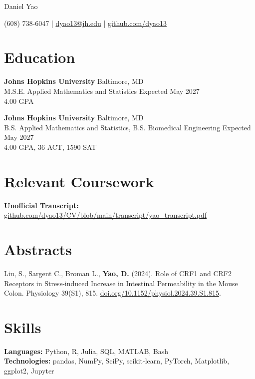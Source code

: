 \documentclass[11pt]{article}       %
\begin{document}
\centerline{\Huge Daniel Yao}

\vspace{5pt}

\centerline{(608) 738-6047 | \href{mailto:dyao13@jh.edu}{dyao13@jh.edu} | \href{https://github.com/dyao13/}{github.com/dyao13}}

\vspace{-9pt}

\section*{Education}
\textbf{Johns Hopkins University} \hfill Baltimore, MD \\
M.S.E. Applied Mathematics and Statistics \hfill Expected May 2027 \\
4.00 GPA

\vspace{5pt}

\textbf{Johns Hopkins University} \hfill Baltimore, MD \\
B.S. Applied Mathematics and Statistics, B.S. Biomedical Engineering \hfill Expected May 2027 \\
4.00 GPA, 36 ACT, 1590 SAT

\vspace{-9pt}

\section*{Relevant Coursework}
\textbf{Unofficial Transcript:} \href{https://github.com/dyao13/CV/blob/main/transcript/yao_transcript.pdf}{github.com/dyao13/CV/blob/main/transcript/yao\_transcript.pdf}

\vspace{-9pt}

\section*{Abstracts}
Liu, S., Sargent C., Broman L., \textbf{Yao, D.} (2024). Role of CRF1 and CRF2 Receptors in Stress-induced Increase in Intestinal Permeability in the Mouse Colon. Physiology 39(S1), 815. \href{https://doi.org/10.1152/physiol.2024.39.S1.815}{doi.org/10.1152/physiol.2024.39.S1.815}.

\vspace{-9pt}

\section*{Skills}
\textbf{Languages:} Python, R, Julia, SQL, MATLAB, Bash \\
\textbf{Technologies:} pandas, NumPy, SciPy, scikit-learn, PyTorch, Matplotlib, ggplot2, Jupyter
\end{document}
